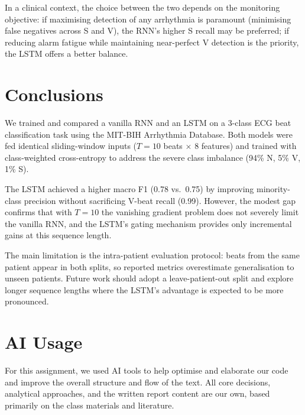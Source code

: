\documentclass[twocolumn, fontsize=10pt]{article}
\begin{document}
In a clinical context, the choice between the two depends on the monitoring
objective: if maximising detection of any arrhythmia is paramount (minimising
false negatives across S and V), the RNN's higher S recall may be preferred;
if reducing alarm fatigue while maintaining near-perfect V detection is the
priority, the LSTM offers a better balance.

\section{Conclusions}
\label{sec:conclusions}

We trained and compared a vanilla RNN and an LSTM on a 3-class ECG beat classification task using the MIT-BIH Arrhythmia Database. Both models were fed identical sliding-window inputs ($T{=}10$ beats $\times$ 8 features) and trained with class-weighted cross-entropy to address the severe class imbalance (94\% N, 5\% V, 1\% S).

The LSTM achieved a higher macro F1 (0.78 vs.\ 0.75) by improving minority-class precision without sacrificing V-beat recall (0.99). However, the modest gap confirms that with $T{=}10$ the vanishing gradient problem does not severely limit the vanilla RNN, and the LSTM's gating mechanism provides only incremental gains at this sequence length.

The main limitation is the intra-patient evaluation protocol: beats from the same patient appear in both splits, so reported metrics overestimate generalisation to unseen patients. Future work should adopt a leave-patient-out split and explore longer sequence lengths where the LSTM's advantage is expected to be more pronounced.



\section*{AI Usage}
For this assignment, we used AI tools to help optimise and elaborate our code and improve the overall structure and flow of the text. All core decisions, analytical approaches, and the written report content are our own, based primarily on the class materials and literature.
\end{document}

